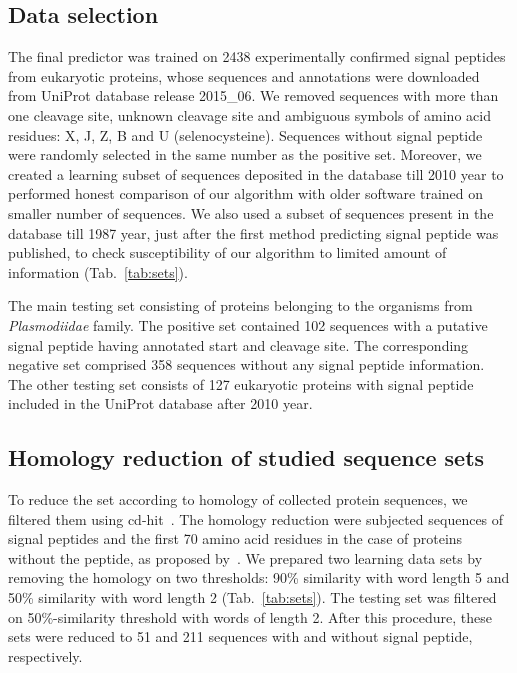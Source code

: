 \documentclass[10pt,letterpaper]{article}
\begin{document}
\subsection*{Data selection}

The final predictor was trained on 2438 experimentally confirmed signal peptides from eukaryotic proteins, whose sequences and annotations were downloaded from UniProt database release 2015\_06. We removed sequences with more than one cleavage site, unknown cleavage site and ambiguous symbols of amino acid residues: X, J, Z, B and U (selenocysteine). Sequences without signal peptide were randomly selected in the same number as the positive set. Moreover, we created a learning subset of sequences deposited in the database till 2010 year to performed honest comparison of our algorithm with older software trained on smaller number of sequences. We also used a subset of sequences present in the database till 1987 year, just after the first method predicting signal peptide was published, to check susceptibility of our algorithm to limited amount of information (Tab.~\ref{tab:sets}).

The main testing set consisting of proteins belonging to the organisms from \textit{Plasmodiidae} family. The positive set contained 102 sequences with a putative signal peptide having annotated start and cleavage site. The corresponding negative set comprised 358 sequences without any signal peptide information. The other testing set consists of 127 eukaryotic proteins with signal peptide included in the UniProt database after 2010 year. 

 
\subsection*{Homology reduction of studied sequence sets}

To reduce the set according to homology of collected protein sequences, we filtered them using cd-hit~\cite{2012fucdhit}. The homology reduction were subjected sequences of signal peptides and the first 70 amino acid residues in the case of proteins without the peptide, as proposed by~\cite{1997nielsenidentification}. We prepared two learning data sets by removing the homology on two thresholds: 90\% similarity with word length 5 and 50\% similarity with word length 2 (Tab.~\ref{tab:sets}). The testing set was filtered on 50\%-similarity threshold with words of length 2. After this procedure, these sets were reduced to 51 and 211 sequences with and without signal peptide, respectively.
\end{document}
